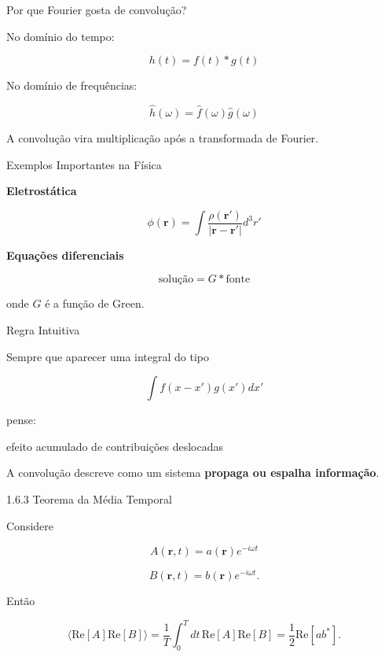 \documentclass[aspectratio=169]{beamer}
\begin{document}

\begin{frame}{Por que Fourier gosta de convolução?}

No domínio do tempo:

\[
h(t)=f(t)*g(t)
\]

No domínio de frequências:

\[
\hat h(\omega)=\hat f(\omega)\hat g(\omega)
\]

\begin{tcolorbox}[colback=blue!5,colframe=blue]
A convolução vira multiplicação após a transformada de Fourier.
\end{tcolorbox}

\end{frame}


\begin{frame}{Exemplos Importantes na Física}

\textbf{Eletrostática}

\[
\phi(\mathbf r)=
\int
\frac{\rho(\mathbf r')}{|\mathbf r-\mathbf r'|}
d^3r'
\]

\textbf{Equações diferenciais}

\[
\text{solução}=G * \text{fonte}
\]

onde $G$ é a função de Green.

\end{frame}


\begin{frame}{Regra Intuitiva}

Sempre que aparecer uma integral do tipo

\[
\int f(x-x')g(x')dx'
\]

pense:

\begin{tcolorbox}[colback=blue!5,colframe=blue]
efeito acumulado de contribuições deslocadas
\end{tcolorbox}

A convolução descreve como um sistema
\textbf{propaga ou espalha informação}.

\end{frame}
\begin{frame}{1.6.3 Teorema da Média Temporal}

Considere

\[
A(\mathbf r,t)=a(\mathbf r)e^{-i\omega t}
\]

\[
B(\mathbf r,t)=b(\mathbf r)e^{-i\omega t}.
\]

Então

\begin{equation}
\langle
\mathrm{Re}[A]\mathrm{Re}[B]
\rangle
=
\frac{1}{T}
\int_0^T
dt\,\mathrm{Re}[A]\mathrm{Re}[B]
=
\frac12
\mathrm{Re}[ab^*].
\tag{1.137}
\end{equation}

\end{frame}
\end{document}
